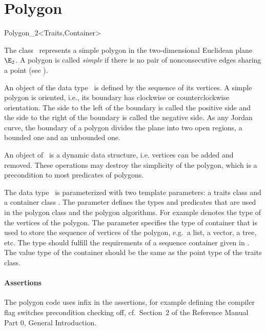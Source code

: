 
\cleardoublepage
\chapter{Polygon}\label{Polygon}

\begin{ccClassTemplate}{Polygon_2<Traits,Container>}

\ccDefinition

The class \ccClassName\ represents a simple polygon in the two-dimensional
Euclidean plane $\E_2$. A polygon is called {\em simple} if there is no pair
of nonconsecutive edges sharing a point (see \cite{ps-cgi-85}).

An object  of the data type \ccClassName\ is defined by the sequence
of its vertices. A simple polygon  is oriented, i.e., its boundary has
clockwise or counterclockwise orientation. The side to the left of the boundary
is called the positive side and the side to the right of the boundary is called
the negative side.  As any Jordan curve, the boundary of a polygon divides the
plane into two open regions, a bounded one and an unbounded one.

An object  of \ccClassName\ is a dynamic data
structure, i.e. vertices can be added and removed. These operations may
destroy the simplicity of the polygon, which is a precondition to most
predicates of polygons.

The data type \ccClassName\ is parameterized with two template parameters: 
a traits class  and a container class . 
The parameter  defines the types and predicates
that are used in the polygon class and the polygon algorithms.
For example  denotes the type of the vertices
of the polygon. 
The parameter  specifies the type of container that is 
used to store the sequence of vertices of the polygon, e.g.\ a list, a vector, 
a tree, etc.
The type  should fulfill the requirements of a sequence 
container given in \cite{ms-strg-96}. 
The value type of the container should be the same as the point type of the 
traits class.

\subsubsection*{Assertions}
The polygon code uses infix  in the assertions,
for example defining the compiler flag
 switches precondition
checking off, cf.~Section~2 of the Reference Manual Part 0, General 
Introduction.


\end{ccClassTemplate}
